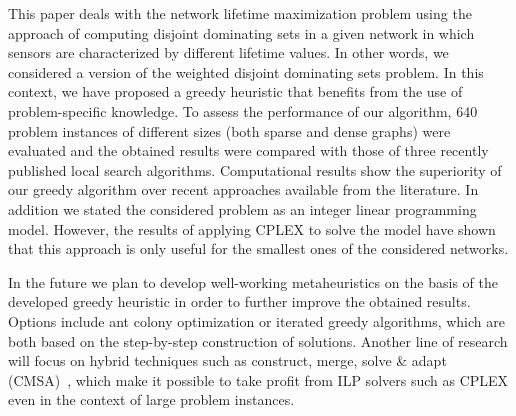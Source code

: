 \documentclass[algorithms,article,accept,moreauthors,pdftex]{Definitions/mdpi}
\begin{document}
\begin{paracol}{2}
This paper deals with the network lifetime maximization problem using the approach of computing disjoint dominating sets in a given network in which sensors are characterized by different lifetime values. In other words, we considered a version of the weighted disjoint dominating sets problem. In this context, we have proposed a greedy heuristic that benefits from the use of problem-specific knowledge. To assess the performance of our algorithm, 640 problem instances of different sizes (both sparse and dense graphs) were evaluated and the obtained results were compared with those of three recently published local search algorithms. Computational results show the superiority of our greedy algorithm over recent approaches available from the literature. In addition we stated the considered problem as an integer linear programming model. However, the results of applying CPLEX to solve the model have shown that this approach is only useful for the smallest ones of the considered networks.

In the future we plan to develop well-working metaheuristics on the basis of the developed greedy heuristic in order to further improve the obtained results. Options include ant colony optimization or iterated greedy algorithms, which are both based on the step-by-step construction of solutions. Another line of research will focus on hybrid techniques such as construct, merge, solve \& adapt (CMSA)~\cite{DBLP:journals/cor/BlumDLL16}, which make it possible to take profit from ILP solvers such as CPLEX even in the context of large problem instances.




\end{paracol}
\end{document}
